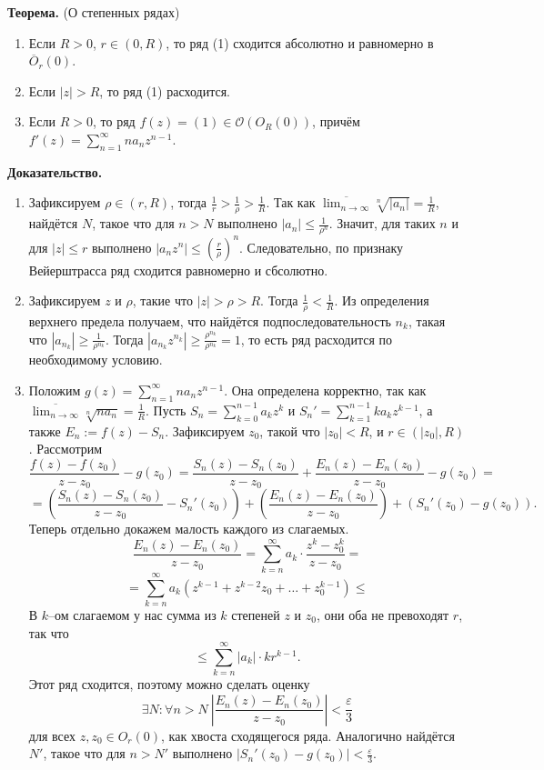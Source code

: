 \textbf{Теорема.} (О степенных рядах)
\begin{enumerate}
    \item Если $R > 0$, $r \in (0, R)$, то ряд (1) сходится абсолютно и равномерно в $\overline O_r(0)$.
    \item Если $|z| > R$, то ряд (1) расходится.
    \item Если $R > 0$, то ряд $f(z) = (1) \in \mathcal O(O_R(0))$, причём $f'(z) = \sum_{n=1}^{\infty} n a_n z^{n-1}$.
\end{enumerate}

\textbf{Доказательство.}
\begin{enumerate}
    \item Зафиксируем $\rho \in (r, R)$, тогда $\frac{1}{r} > \frac{1}{\rho} > \frac{1}{R}$.
        Так как $\overline{\lim_{n \to \infty}} \sqrt[n]{|a_n|} = \frac{1}{R}$, найдётся $N$, такое что для $n > N$ выполнено $|a_n| \le \frac{1}{\rho^n}$.
        Значит, для таких $n$ и для $|z| \le r$ выполнено $|a_n z^n| \le \left( \frac{r}{\rho} \right)^n$.
        Следовательно, по признаку Вейерштрасса ряд сходится равномерно и сбсолютно.

    \item Зафиксируем $z$ и $\rho$, такие что $|z| > \rho > R$.
        Тогда $\frac{1}{\rho} < \frac{1}{R}$.
        Из определения верхнего предела получаем, что найдётся подпоследовательность $n_k$, такая что $|a_{n_k}| \ge \frac{1}{\rho^{n_k}}$.
        Тогда $|a_{n_k} z^{n_k}| \ge \frac{\rho^{n_k}}{\rho^{n_k}} = 1$, то есть ряд расходится по необходимому условию.

    \item Положим $g(z) = \sum_{n=1}^{\infty} n a_n z^{n-1}$.
        Она определена корректно, так как $\overline {\lim_{n \to \infty}} \sqrt[n]{n a_n} = \frac{1}{R}$.
        Пусть $S_n = \sum_{k=0}^{n-1} a_k z^k$ и $S_n' = \sum_{k=1}^{n-1} k a_k z^{k-1}$, а также $E_n := f(z) - S_n$.
        Зафиксируем $z_0$, такой что $|z_0| < R$, и $r \in (|z_0|, R)$.
        Рассмотрим
        \[
            \frac{f(z) - f(z_0)}{z - z_0} - g(z_0) = \frac{S_n(z) - S_n(z_0)}{z - z_0} + \frac{E_n(z) - E_n(z_0)}{z - z_0} - g(z_0) =
        \]
        \[
            = \left( \frac{S_n(z) - S_n(z_0)}{z - z_0} - S_n'(z_0) \right) + \left( \frac{E_n(z) - E_n(z_0)}{z - z_0} \right) + \left(S_n'(z_0) - g(z_0) \right).
        \]
        Теперь отдельно докажем малость каждого из слагаемых.
        \[
            \frac{E_n(z) - E_n(z_0)}{z - z_0} = \sum_{k=n}^{\infty} a_k \cdot \frac{z^k - z^k_0}{z - z_0} = 
        \]
        \[
            = \sum_{k=n}^{\infty} a_k(z^{k-1} + z^{k-2} z_0 + \dots + z_0^{k-1}) \le
        \]
        В $k$--ом слагаемом у нас сумма из $k$ степеней $z$ и $z_0$, они оба не превоходят $r$, так что
        \[
            \le \sum_{k=n}^{\infty} |a_k| \cdot k r^{k-1}.
        \]
        Этот ряд сходится, поэтому можно сделать оценку
        \[
            \exists N: \forall n > N~\left| \frac{E_n(z) - E_n(z_0)}{z - z_0} \right| < \frac{\varepsilon}{3}
        \]
        для всех $z, z_0 \in O_r(0)$, как хвоста сходящегося ряда.
        Аналогично найдётся $N'$, такое что для $n > N'$ выполнено $|S_n'(z_0) - g(z_0)| < \frac{\varepsilon}{3}$.


\end{enumerate}
